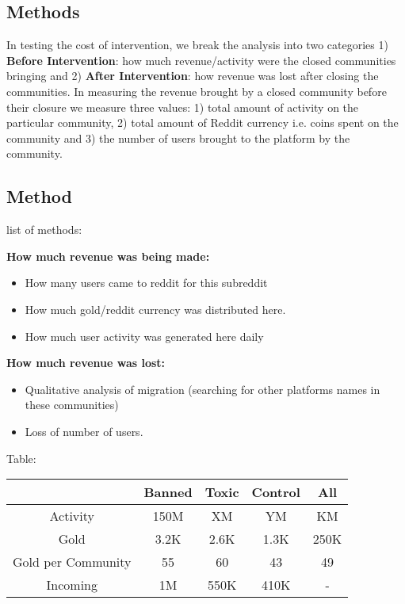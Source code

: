 \subsection{Methods}
In testing the cost of intervention, we break the analysis into two categories 1) \textbf{Before Intervention}: how much revenue/activity were the closed communities bringing and 2) \textbf{After Intervention}: how revenue was lost after closing the communities. In measuring the revenue brought by a closed community before their closure we measure three values: 1) total amount of activity on the particular community, 2) total amount of Reddit currency i.e. coins spent on the community and 3) the number of users brought to the platform by the community.  

\subsection{Method}
list of methods:

\textbf{How much revenue was being made:}
\begin{itemize}
    \item How many users came to reddit for this subreddit
    \item How much gold/reddit currency was distributed here.
    \item How much user activity was generated here daily \\
\end{itemize}

\textbf{How much revenue was lost:}
\begin{itemize}
    \item Qualitative analysis of migration (searching for other platforms names in these communities)
    \item Loss of number of users.
\end{itemize}



Table:

\begin{center}
\begin{tabular}{ c | c |  c | c | c}
 & \textbf{Banned} & \textbf{Toxic} & \textbf{Control} & \textbf{All} \\
 \midrule
Activity 		& 150M	& XM	& YM 	& KM	\\
Gold	 		& 3.2K	& 2.6K	& 1.3K 	& 250K	\\
Gold per Community 	& 55	& 60	& 43 	& 49	\\
Incoming 		& 1M	& 550K	& 410K 	& -	\\
\end{tabular}
\end{center}

